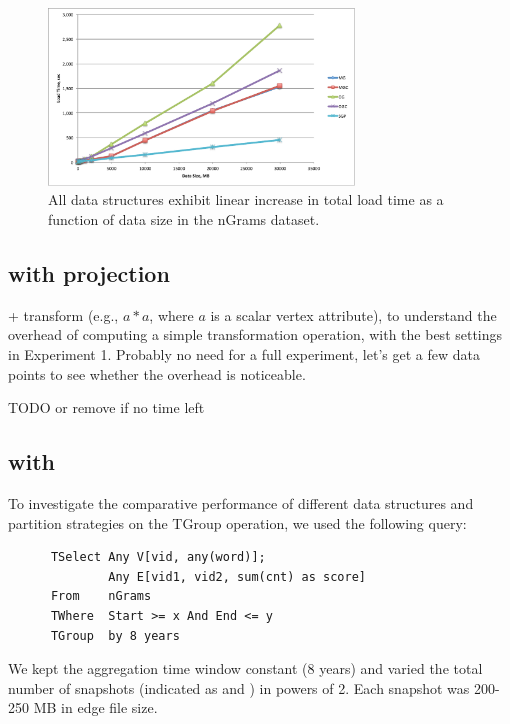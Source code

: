 \begin{figure}[t!]
\includegraphics[width=3.2in]{figs/tselect.pdf}
\caption{All data structures exhibit linear increase in total load
  time as a function of data size in the nGrams dataset.}
\label{fig:tselect}
\end{figure}

\subsection{ with projection}

 + transform (e.g., $a * a$, where $a$ is a
  scalar vertex attribute), to understand the overhead of computing a
  simple transformation operation, with the best settings in
  Experiment 1.  Probably no need for a full experiment,
  let's get a few data points to see whether the overhead is
  noticeable.

TODO or remove if no time left

\subsection{ with }

To investigate the comparative performance of different data
structures and partition strategies on the TGroup operation, we used
the following query:

\begin{small}
\begin{verbatim}
      TSelect Any V[vid, any(word)];
              Any E[vid1, vid2, sum(cnt) as score]
      From    nGrams
      TWhere  Start >= x And End <= y
      TGroup  by 8 years
\end{verbatim}
\end{small}

We kept the aggregation time window constant (8 years) and varied the
total number of snapshots (indicated as  and ) in
powers of 2.  Each snapshot was 200-250 MB in edge file size.

